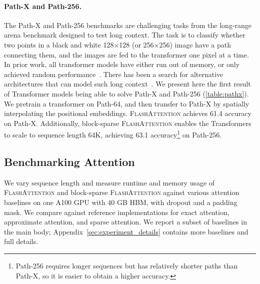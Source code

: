 \paragraph{Path-X and Path-256.} The Path-X and Path-256 benchmarks are challenging tasks from the long-range arena benchmark designed to test long context. The task is to classify whether two points in a black and white 128$\times$128 (or 256$\times$256) image have a path connecting them, and the images are fed to the transformer one pixel at a time. In prior work, all transformer models have either run out of memory, or only achieved random performance~\citep{tay2020long}. There has been a search for alternative architectures that can model such long context~\citep{gu2022efficiently}. We present here the first result of Transformer models being able to solve Path-X and Path-256 (\ref{table:pathx}).
We pretrain a transformer on Path-64, and then transfer to Path-X by spatially interpolating the positional embeddings.
\textsc{FlashAttention} achieves 61.4 accuracy on Path-X. Additionally, block-sparse \textsc{FlashAttention} enables the Transformers to scale to sequence length 64K, achieving 63.1 accuracy\footnote{Path-256 requires longer sequences but has relatively shorter paths than Path-X, so it is easier to obtain a higher accuracy.} on Path-256.

\subsection{Benchmarking Attention}
\label{sec:benchmark}

We vary sequence length and measure runtime and memory usage of \textsc{FlashAttention} and block-sparse \textsc{FlashAttention} against various attention baselines on one A100 GPU with 40 GB HBM, with dropout and a padding mask. We compare against reference implementations for exact attention, approximate attention, and sparse attention. We report a subset of baselines in the main body; Appendix~\ref{sec:experiment_details} contains more baselines and full details.

